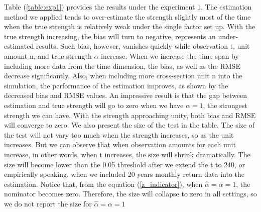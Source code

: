 Table (\ref{table:exp1}) provides the results under the experiment 1.
The estimation method we applied tends to over-estimate the strength slightly most of the time when the true strength is relatively weak under the single factor set up.
With the true strength increasing, the bias will turn to negative, represents an under-estimated results.
Such bias, however, vanishes quickly while observation t, unit amount n, and true strength $\alpha$ increase.
When we increase the time span by including more data from the time dimension, the bias, as well as the RMSE decrease significantly.
Also, when including more cross-section unit n into the simulation, the performance of the estimation improves, as shown by the decreased bias and RMSE values.
An impressive result is that the gap between estimation and true strength will go to zero when we have $\alpha = 1$, the strongest strength we can have.
With the strength approaching unity, both bias and RMSE will converge to zero.
We also present the size of the test in the table.
The size of the test will not vary too much when the strength increases, so as the unit increases.
But we can observe that when observation amounts for each unit increase, in other words, when t increases, the size will shrink dramatically.
The size will become lower than the 0.05 threshold after we extend the t to 240, or empirically speaking, when we included 20 years monthly return data into the estimation.
Notice that, from the equation (\ref{z_indicator}), when $\hat{\alpha} = \alpha = 1$, the nominator becomes zero.
Therefore, the size will collapse to zero in all settings, so we do not report the size for $\hat{\alpha} = \alpha = 1$

